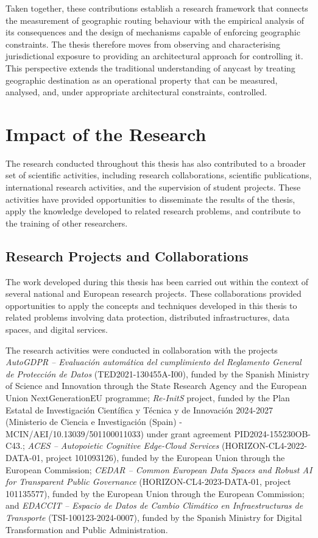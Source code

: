 Taken together, these contributions establish a research framework that connects the measurement of geographic routing behaviour with the empirical analysis of its consequences and the design of mechanisms capable of enforcing geographic constraints. The thesis therefore moves from observing and characterising jurisdictional exposure to providing an architectural approach for controlling it. This perspective extends the traditional understanding of anycast by treating geographic destination as an operational property that can be measured, analysed, and, under appropriate architectural constraints, controlled.

\section{Impact of the Research}
\label{sc:conclusion_impact}

The research conducted throughout this thesis has also contributed to a broader set of scientific activities, including research collaborations, scientific publications, international research activities, and the supervision of student projects. These activities have provided opportunities to disseminate the results of the thesis, apply the knowledge developed to related research problems, and contribute to the training of other researchers.

\subsection{Research Projects and Collaborations}
\label{sc:conclusion_projects}

The work developed during this thesis has been carried out within the context of several national and European research projects. These collaborations provided opportunities to apply the concepts and techniques developed in this thesis to related problems involving data protection, distributed infrastructures, data spaces, and digital services.

The research activities were conducted in collaboration with the projects \emph{AutoGDPR -- Evaluación automática del cumplimiento del Reglamento General de Protección de Datos} (TED2021-130455A-I00), funded by the Spanish Ministry of Science and Innovation through the State Research Agency and the European Union NextGenerationEU programme; \emph{Re-InitS} project, funded by the Plan Estatal de Investigación Científica y Técnica y de Innovación 2024-2027 (Ministerio de Ciencia e Investigación (Spain) - MCIN/AEI/10.13039/501100011033) under grant agreement PID2024-155230OB-C43.; \emph{ACES -- Autopoietic Cognitive Edge-Cloud Services} (HORIZON-CL4-2022-DATA-01, project 101093126), funded by the European Union through the European Commission; \emph{CEDAR -- Common European Data Spaces and Robust AI for Transparent Public Governance} (HORIZON-CL4-2023-DATA-01, project 101135577), funded by the European Union through the European Commission; and \emph{EDACCIT -- Espacio de Datos de Cambio Climático en Infraestructuras de Transporte} (TSI-100123-2024-0007), funded by the Spanish Ministry for Digital Transformation and Public Administration.

